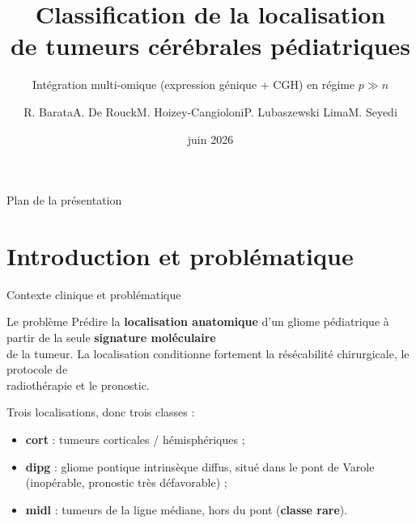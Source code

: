 \documentclass[aspectratio=169, 10pt]{beamer}
\title[Localisation de tumeurs cérébrales]{Classification de la localisation \\ de tumeurs cérébrales pédiatriques}
\subtitle{Intégration multi-omique (expression génique + CGH) en régime \texorpdfstring{$p \gg n$}{p >> n}}
\author[]{R. Barata\texorpdfstring{\quad}{ }A. De Rouck\texorpdfstring{\quad}{ }M. Hoizey-Cangioloni\texorpdfstring{\quad}{ }P. Lubaszewski Lima\texorpdfstring{\quad}{ }M. Seyedi}
\institute[CentraleSupélec]{CentraleSupélec \\ \small Encadrant : Arthur Tenenhaus}
\date[juin 2026]{juin 2026}
\begin{document}
\begin{frame}[plain]
  \titlepage
\end{frame}

\begin{frame}{Plan de la présentation}
  \tableofcontents
\end{frame}

\section{Introduction et problématique}

\begin{frame}{Contexte clinique et problématique}
  \begin{block}{Le problème}
    Prédire la \textbf{localisation anatomique} d’un gliome pédiatrique à partir de la seule \textbf{signature moléculaire}\\
    de la tumeur. La localisation conditionne fortement la résécabilité chirurgicale, le protocole de\\
    radiothérapie et le pronostic.
  \end{block}

  \bigskip
  Trois localisations, donc trois classes :
  \begin{itemize}
    \item \textbf{cort} : tumeurs corticales / hémisphériques ;
    \item \textbf{dipg} : gliome pontique intrinsèque diffus, situé dans le pont de Varole (inopérable, pronostic très défavorable) ;
    \item \textbf{midl} : tumeurs de la ligne médiane, hors du pont (\textbf{classe rare}).
  \end{itemize}
\end{frame}
\end{document}
